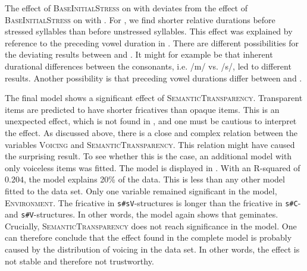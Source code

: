 The effect of \textsc{BaseInitialStress} on  with  deviates from the effect of \textsc{BaseInitialStress} on  with . For , we find shorter relative durations before stressed syllables than before unstressed syllables. This effect was explained by reference to the preceding vowel duration in . There are different possibilities for the deviating results between  and . It might for example be that inherent durational differences between the consonants, i.e. /m/ vs. /s/, led to different results. Another possibility is that preceding vowel durations differ between  and .
          

\hspace*{-0.67183pt}The final  model shows a significant effect of \textsc{SemanticTrans\-parency}. Transparent items are predicted to have shorter fricatives than opaque items. This is an unexpected effect, which is not found in , and one must be cautious to interpret the effect. 
 As discussed above, there is a close and complex relation between the variables \textsc{Voicing} and \textsc{SemanticTransparency}. This relation might have caused the surprising result. To see whether this is the case, an additional model with only voiceless items was fitted. The model is displayed in .
 With an R-squared of $0.204$, the model explains 20\% of the data. This is less than any other model fitted to the data set. Only one variable remained significant in the model, \textsc{Environment}. The fricative in \texttt{s\#sV}-structures is longer than the fricative in \texttt{s\#C}- and \texttt{s\#V}-structures. In other words, the model again shows that  geminates. 
 Crucially, \textsc{SemanticTransparency} does not reach significance in the model. One can therefore conclude that the effect found in the complete model is probably caused by the distribution of voicing in the data set. In other words, the effect is not stable and therefore not trustworthy.

